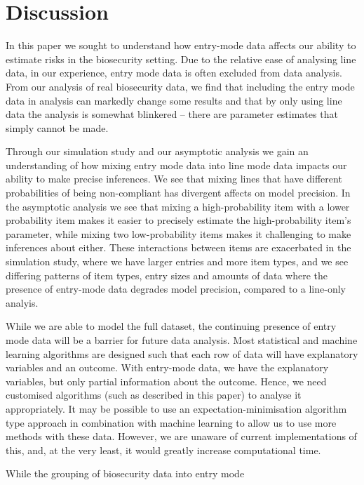 \documentclass{article}
\begin{document}
\section{Discussion}

In this paper we sought to understand how entry-mode data affects our ability to estimate risks in the biosecurity setting. Due to the relative ease of analysing line data, in our experience, entry mode data is often excluded from data analysis. From our analysis of real biosecurity data, we find that including the entry mode data in analysis can markedly change some results and that by only using line data the analysis is somewhat blinkered -- there are parameter estimates that simply cannot be made. 

Through our simulation study and our asymptotic analysis we gain an understanding of how mixing entry mode data into line mode data impacts our ability to make precise inferences. We see that mixing lines that have different probabilities of being non-compliant has divergent affects on model precision. In the asymptotic analysis we see that mixing a high-probability item with a lower probability item makes it easier to precisely estimate the high-probability item's parameter, while mixing two low-probability items makes it challenging to make inferences about either. These interactions between items are exacerbated in the simulation study, where we have larger entries and more item types, and we see differing patterns of item types, entry sizes and amounts of data where the presence of entry-mode data degrades model precision, compared to a line-only analyis. 

While we are able to model the full dataset, the continuing presence of entry mode data will be a barrier for future data analysis. Most statistical and machine learning algorithms are designed such that each row of data will have explanatory variables and an outcome. With entry-mode data, we have the explanatory variables, but only partial information about the outcome. Hence, we need customised algorithms (such as described in this paper) to analyse it appropriately. It may be possible to use an expectation-minimisation algorithm type approach in combination with machine learning to allow us to use more methods with these data. However, we are unaware of current implementations of this, and, at the very least, it would greatly increase computational time.

While the grouping of biosecurity data into entry mode
\end{document}
